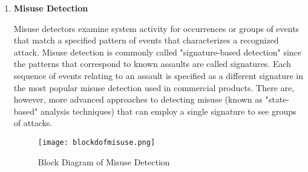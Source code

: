 \documentclass[12pt]{article}
\begin{document}
    \clearpage
    \begin{enumerate}
        \item \textbf{Misuse Detection}
        \par Misuse detectors examine system activity for occurrences or groups of events that match a specified pattern of events that characterizes a recognized attack. Misuse detection is commonly called "signature-based detection" since the patterns that correspond to known assaults are called signatures. Each sequence of events relating to an assault is specified as a different signature in the most popular misuse detection used in commercial products. There are, however, more advanced approaches to detecting misuse (known as "state-based" analysis techniques) that can employ a single signature to see groups of attacks.
        
        \begin{figure}[h]
        \centering
        \texttt{[image: blockdofmisuse.png]}
        \caption{Block Diagram of Misuse Detection}
    \end{figure}
    

\end{enumerate}
\end{document}
